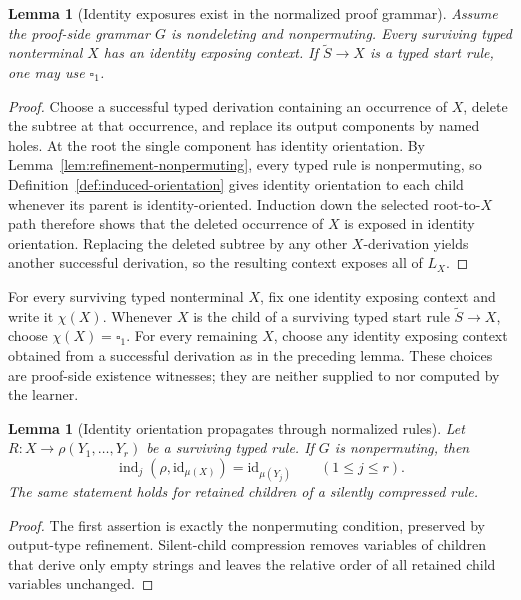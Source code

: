 \documentclass[11pt,a4paper]{article}
\numberwithin{equation}{section}
\theoremstyle{plain}
\newtheorem{lemma}[theorem]{Lemma}
\theoremstyle{definition}
\theoremstyle{remark}
\newcommand{\blank}{\square}
\begin{document}
\begin{lemma}[Identity exposures exist in the normalized proof grammar]
\label{lem:identity-exposing-contexts}
Assume the proof-side grammar \(G\) is nondeleting and nonpermuting.  Every
surviving typed nonterminal \(X\) has an identity exposing context.  If
\(\widetilde S\to X\) is a typed start rule, one may use \(\blank_1\).
\end{lemma}

\begin{proof}
Choose a successful typed derivation containing an occurrence of \(X\), delete
the subtree at that occurrence, and replace its output components by named
holes.  At the root the single component has identity orientation.  By
Lemma~\ref{lem:refinement-nonpermuting}, every typed rule is nonpermuting, so
Definition~\ref{def:induced-orientation} gives identity orientation to each
child whenever its parent is identity-oriented.  Induction down the selected
root-to-\(X\) path therefore shows that the deleted occurrence of \(X\) is
exposed in identity orientation.  Replacing the deleted subtree by any other
\(X\)-derivation yields another successful derivation, so the resulting
context exposes all of \(L_X\).
\end{proof}

For every surviving typed nonterminal \(X\), fix one identity exposing context
and write it \(\chi(X)\).  Whenever \(X\) is the child of a surviving typed
start rule \(\widetilde S\to X\), choose \(\chi(X)=\blank_1\).  For every
remaining \(X\), choose any identity exposing context obtained from a
successful derivation as in the preceding lemma.  These choices are
proof-side existence witnesses; they are neither supplied to nor computed by
the learner.

\begin{lemma}[Identity orientation propagates through normalized rules]
\label{lem:identity-orientation-propagation}
Let \(R:X\to\rho(Y_1,\ldots,Y_r)\) be a surviving typed rule.  If \(G\) is
nonpermuting, then
\[
  \operatorname{ind}_j(\rho,\mathrm{id}_{\mu(X)})
  =\mathrm{id}_{\mu(Y_j)}
  \qquad(1\le j\le r).
\]
The same statement holds for retained children of a silently compressed rule.
\end{lemma}

\begin{proof}
The first assertion is exactly the nonpermuting condition, preserved by
output-type refinement.  Silent-child compression removes variables of
children that derive only empty strings and leaves the relative order of all
retained child variables unchanged.
\end{proof}
\end{document}
